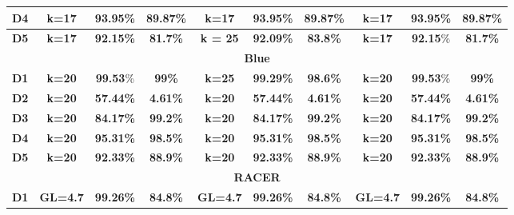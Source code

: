 \begin{table}
{\begin{tabular}{ |c|c|c|c|c|c|c|c|c|c| }
\\ \hline                        
                        \textbf{D4} & \textbf{k=17} & \textbf{93.95}\% & \textbf{89.87\%} &
                         \textbf{k=17} & \textbf{93.95\%} & \textbf{89.87\%} &
                         \textbf{k=17} & \textbf{93.95\%} & \textbf{89.87\%}
\\ \hline                           
                         \textbf{D5} & \textbf{k=17} & \textbf{92.15\%} & \textbf{81.7\%} & \textbf{k = 25} & \textbf{92.09\%} & \textbf{83.8\%} &
                         \textbf{k=17} & \textbf{92.15}\% & \textbf{81.7\%} \\
  \hline
  \multicolumn{10}{|c|}{\textbf{Blue}}\\
  \hline
 					 \textbf{D1} & \textbf{k=20} & \textbf{99.53}\% & \textbf{99\%} & \textbf{k=25} & \textbf{99.29\%} & \textbf{98.6\%} & \textbf{k=20} & \textbf{99.53}\% & \textbf{99\%}
\\ \hline
     					  \textbf{D2} & \textbf{k=20} & \textbf{57.44\%} & \textbf{4.61\%} & \textbf{k=20} & \textbf{57.44\%} & \textbf{4.61\%} & \textbf{k=20} & \textbf{57.44\%} & \textbf{4.61\%} 
\\ \hline
     				 \textbf{D3}  & \textbf{ k=20} & \textbf{84.17\%} & \textbf{99.2\%} & \textbf{k=20} & \textbf{84.17\%} & \textbf{99.2\%} & \textbf{k=20} & \textbf{84.17\%} & \textbf{99.2\%} 
\\ \hline                        
                         \textbf{D4} & \textbf{ k=20} & \textbf{95.31\%} & \textbf{98.5\%} & \textbf{ k=20} & \textbf{95.31\%} & \textbf{98.5\%} & \textbf{ k=20} & \textbf{95.31\%} & \textbf{98.5\%}
\\ \hline                           
                         \textbf{D5} & \textbf{ k=20} & \textbf{92.33\%} & \textbf{88.9\%} & \textbf{ k=20} & \textbf{92.33\%} & \textbf{88.9\%} & \textbf{ k=20} & \textbf{92.33\%} & \textbf{88.9\%}\\
  \hline
  \multicolumn{10}{|c|}{\textbf{RACER}}\\
  \hline
                         \textbf{D1} & \textbf{GL=4.7} & \textbf{99.26\%} & \textbf{84.8\%} & \textbf{GL=4.7} & \textbf{99.26\%} & \textbf{84.8\%} & \textbf{GL=4.7} & \textbf{99.26\%} & \textbf{84.8\%}\\ 
 \hline

\end{tabular}}
\end{table}
